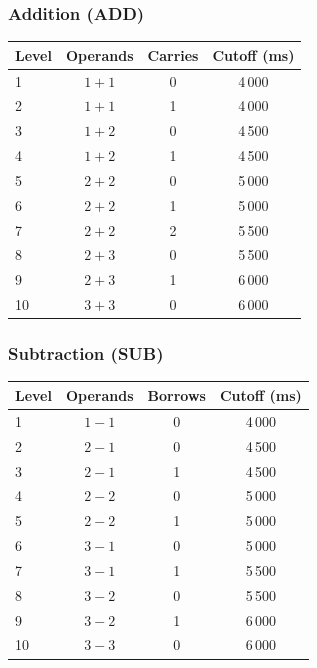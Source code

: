 \documentclass[11pt]{article}
\begin{document}
\noindent
\begin{minipage}[t]{0.48\textwidth}
\subsubsection*{Addition (ADD)}
\begin{center}
\begin{tabular}{@{}lccc@{}}
\toprule
\textbf{Level} & \textbf{Operands} & \textbf{Carries} & \textbf{Cutoff (ms)} \\
\midrule
1  & $1 + 1$ & 0 & 4\,000 \\
2  & $1 + 1$ & 1 & 4\,000 \\
3  & $1 + 2$ & 0 & 4\,500 \\
4  & $1 + 2$ & 1 & 4\,500 \\
5  & $2 + 2$ & 0 & 5\,000 \\
6  & $2 + 2$ & 1 & 5\,000 \\
7  & $2 + 2$ & 2 & 5\,500 \\
8  & $2 + 3$ & 0 & 5\,500 \\
9  & $2 + 3$ & 1 & 6\,000 \\
10 & $3 + 3$ & 0 & 6\,000 \\
\bottomrule
\end{tabular}
\end{center}
\end{minipage}
\hfill
\begin{minipage}[t]{0.48\textwidth}
\subsubsection*{Subtraction (SUB)}
\begin{center}
\begin{tabular}{@{}lccc@{}}
\toprule
\textbf{Level} & \textbf{Operands} & \textbf{Borrows} & \textbf{Cutoff (ms)} \\
\midrule
1  & $1 - 1$ & 0 & 4\,000 \\
2  & $2 - 1$ & 0 & 4\,500 \\
3  & $2 - 1$ & 1 & 4\,500 \\
4  & $2 - 2$ & 0 & 5\,000 \\
5  & $2 - 2$ & 1 & 5\,000 \\
6  & $3 - 1$ & 0 & 5\,000 \\
7  & $3 - 1$ & 1 & 5\,500 \\
8  & $3 - 2$ & 0 & 5\,500 \\
9  & $3 - 2$ & 1 & 6\,000 \\
10 & $3 - 3$ & 0 & 6\,000 \\
\bottomrule
\end{tabular}
\end{center}
\end{minipage}
\end{document}

